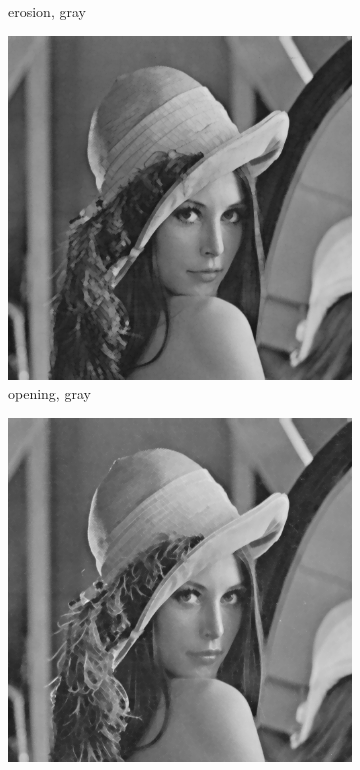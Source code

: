 \begin{figure}[!ht]
\begin{subfigure}[t]{0.22\textwidth}
    \caption{erosion, gray}
    \centering
  \end{subfigure}
\begin{subfigure}[t]{0.22\textwidth}
    \includegraphics[width=0.9\linewidth]{../project/images/outputs/compare_gray/opening_gray.png}
    \caption{opening, gray}
    \centering
  \end{subfigure}
\begin{subfigure}[t]{0.22\textwidth}
    \includegraphics[width=0.9\linewidth]{../project/images/outputs/compare_gray/closing_gray.png}

\end{subfigure}
\end{figure}

